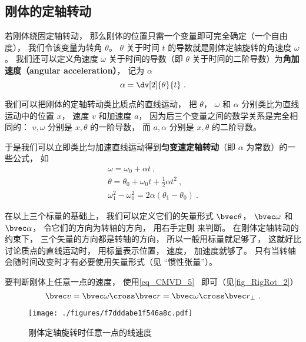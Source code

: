 

\subsection{刚体的定轴转动}
若刚体绕固定轴转动， 那么刚体的位置只需一个变量即可完全确定（一个自由度）， 我们令该变量为转角 $\theta$。 $\theta$ 关于时间 $t$ 的导数就是刚体定轴旋转的角速度 $\omega$。 我们还可以定义角速度 $\omega$ 关于时间的导数（即 $\theta$ 关于时间的二阶导数）为\textbf{角加速度（angular acceleration）}， 记为 $\alpha$
\begin{equation}
\alpha = \dv[2]{\theta}{t}~.
\end{equation}

我们可以把刚体的定轴转动类比质点的直线运动， 把 $\theta$， $\omega$ 和 $\alpha$ 分别类比为直线运动中的位置 $x$， 速度 $v$ 和加速度 $a$， 因为后三个变量之间的数学关系是完全相同的： $v, \omega$ 分别是 $x, \theta$ 的一阶导数， 而 $a, \alpha$ 分别是 $x, \theta$ 的二阶导数。

于是我们可以立即类比匀加速直线运动得到\textbf{匀变速定轴转动}（即 $\alpha$ 为常数）的一些公式， 如
\begin{gather}
\omega = \omega_0 + \alpha t~,\\
\theta = \theta_0 + \omega_0 t + \frac12 \alpha t^2~,\\
\omega_1^2 - \omega_0^2 = 2\alpha (\theta_1-\theta_0)~.
\end{gather}

在以上三个标量的基础上， 我们可以定义它们的矢量形式 $\bvec \theta$， $\bvec \omega$ 和 $\bvec \alpha$， 令它们的方向为转轴的方向， 用右手定则 来判断。 在刚体定轴转动的约束下， 三个矢量的方向都是转轴的方向， 所以一般用标量就足够了， 这就好比讨论质点的直线运动时， 用标量表示位置， 速度， 加速度就够了。 只有当转轴会随时间改变时才有必要使用矢量形式（见 “惯性张量”）。

要判断刚体上任意一点的速度， 使用\autoref{eq_CMVD_5}~ 即可（见\autoref{fig_RigRot_2}）
\begin{equation}
\bvec v = \bvec \omega \cross \bvec r = \bvec \omega \cross \bvec r_\bot~.
\end{equation}

\begin{figure}[ht]
\centering
\texttt{[image: ./figures/f7dddabe1f546a8c.pdf]}
\caption{刚体定轴旋转时任意一点的线速度} \label{fig_RigRot_2}
\end{figure}

